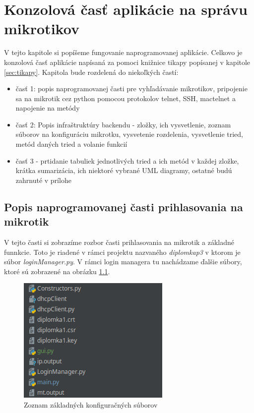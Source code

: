 \chapter{Konzolová časť aplikácie na správu mikrotikov}
V tejto kapitole si popíšeme fungovanie naprogramovanej aplikácie. Celkovo je konzolová časť aplikácie napísaná za pomoci knižnice tikapy popísanej v kapitole \ref{sec:tikapy}. Kapitola bude rozdelená do niekoľkých častí:\begin{itemize}
\item časť 1: popis naprogramovanej časti pre vyhľadávanie mikrotikov, pripojenie sa na mikrotik cez python pomocou protokolov telnet, SSH, mactelnet a napojenie na metódy
\item časť 2: Popis infraštruktúry backendu - zložky, ich vysvetlenie, zoznam súborov na konfiguráciu mikrotku, vysvetenie rozdelenia, vysvetlenie tried, metód daných tried a volanie funkcií
\item časť 3 - prtidanie tabuliek jednotlivých tried a ich metód v každej zložke, krátka sumarizácia, ich niektoré vybrané UML diagramy, ostatné budú zahrnuté v prílohe
\end{itemize}
\section{Popis naprogramovanej časti prihlasovania na mikrotik}
\label{sec:popis1}
V tejto časti si zobrazíme rozbor časti prihlasovania na mikrotik a základné funnkcie. Toto je riadené v rámci projektu nazvaného \textit{diplomkap3} v ktorom je súbor \textit{loginManager.py}. V rámci login managera tu nachádzame ďalšie súbory, ktoré sú zobrazené na obrázku \ref{fig:filesLogin}. 
\begin{figure}[H]
\centering
\includegraphics[scale=0.6]{../text/loginFiles.png}
\caption{Zoznam základných konfiguračných súborov}
\label{fig:filesLogin}
\end{figure} 
